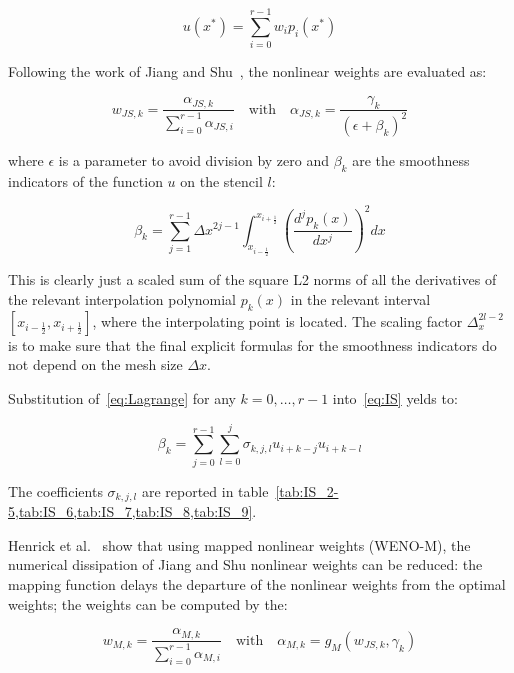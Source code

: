\begin{equation}
  \label{eq:WENO_interp}
  u(x^*) = \sum_{i=0}^{r-1} w_i p_i(x^*)
\end{equation}

Following the work of Jiang and Shu~\cite{jiang-1996}, the nonlinear weights are evaluated as:

\begin{equation}
  \label{eq:nonlinear_weights}
  w_{JS,k} = \frac{\alpha_{JS,k}}{\sum_{i=0}^{r-1} \alpha_{JS,i}} \quad \text{with} \quad \alpha_{JS,k} = \frac{\gamma_k}{\left( \epsilon + \beta_k \right)^2}
\end{equation}

where $\epsilon$ is a parameter to avoid division by zero and $\beta_k$ are the smoothness indicators of the function $u$ on the stencil $l$:

\begin{equation}
  \label{eq:IS}
  \beta_k = \sum_{j=1}^{r-1} \Delta x^{2j-1} \int_{x_{i-\frac{1}{2}}}^{x_{i+\frac{1}{2}}} \left( \frac{d^j p_k(x)}{dx^j} \right)^2 dx
\end{equation}

This is clearly just a scaled sum of the square L2 norms of all the derivatives of the relevant interpolation polynomial $p_k(x)$ in the relevant interval $[x_{i−\frac{1}{2}},x_{i+\frac{1}{2}}]$, where the interpolating point is located. The scaling factor $\Delta_x^{2l-2}$ is to make sure that the final explicit formulas for the smoothness indicators do not depend on the mesh size $\Delta x$.

Substitution of~\eqref{eq:Lagrange} for any $k=0,\dots,r-1$ into~\eqref{eq:IS} yelds to:

\begin{equation}
  \label{eq:IS_u}
  \beta_k = \sum_{j=0}^{r-1} \sum_{l=0}^j \sigma_{k,j,l} u_{i+k-j} u_{i+k-l}
\end{equation}

The coefficients $\sigma_{k,j,l}$ are reported in table~\cref{tab:IS_2-5,tab:IS_6,tab:IS_7,tab:IS_8,tab:IS_9}.

Henrick et al.~\cite{henrick-2005} show that using mapped nonlinear weights (WENO-M), the numerical dissipation of Jiang and Shu nonlinear weights can be reduced: the mapping function delays the departure of the nonlinear weights from the optimal weights; the weights can be computed by the:

\begin{equation}
  \label{eq:weno_M}
  w_{M,k} = \frac{\alpha_{M,k}}{\sum_{i=0}^{r-1} \alpha_{M,i}} \quad \text{with} \quad \alpha_{M,k} = g_M \left( w_{JS,k}, \gamma_k \right)
\end{equation}

